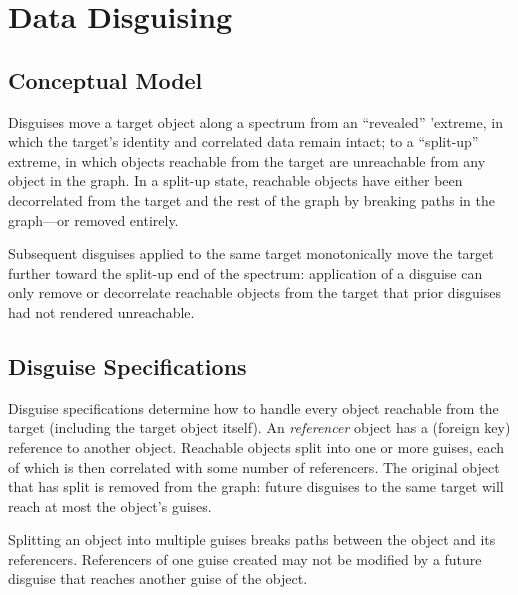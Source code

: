 \section{Data Disguising}
\subsection{Conceptual Model}

Disguises move a target object along a spectrum from an ``revealed'' 'extreme, in which the target's
identity and correlated data remain intact; to a ``split-up'' extreme, in which objects reachable
from the target are unreachable from any object in the graph. In a split-up state, reachable
objects have either been decorrelated from the target and the rest of the graph by breaking paths in
the graph---or removed entirely.

Subsequent disguises applied to the same target monotonically move the target further
toward the split-up end of the spectrum: application of a disguise can only 
remove or decorrelate reachable objects from the target that prior disguises had not
rendered unreachable.

\subsection{Disguise Specifications}
Disguise specifications determine how to handle every object reachable from the target (including
the target object itself). An \emph{referencer} object has a (\eg foreign key) reference to another
object. Reachable objects split into one or more guises, each of which is then correlated with some
number of referencers. The original object that has split is removed from the graph:
future disguises to the same target will reach at most the object's guises.

Splitting an object into multiple guises breaks paths between the object and its referencers. 
Referencers of one guise created may not be modified by a future disguise that
reaches another guise of the object. 

